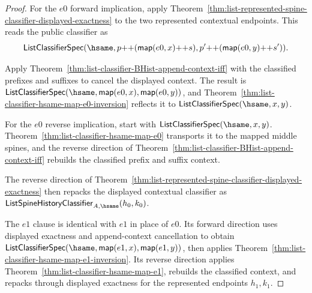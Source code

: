 \begin{proof}
For the $e0$ forward implication, apply
Theorem~\ref{thm:list-represented-spine-classifier-displayed-exactness} to the
two represented contextual endpoints. This reads the public classifier as
$$
\mathsf{ListClassifierSpec}(\hsame,
  p{++}(\mathsf{map}(e0,x){++}s),
  p'{++}(\mathsf{map}(e0,y){++}s')).
$$

Apply Theorem~\ref{thm:list-classifier-BHist-append-context-iff} with the
classified prefixes and suffixes to cancel the displayed context. The result is
$\mathsf{ListClassifierSpec}(\hsame,\mathsf{map}(e0,x),\mathsf{map}(e0,y))$,
and Theorem~\ref{thm:list-classifier-hsame-map-e0-inversion} reflects it to
$\mathsf{ListClassifierSpec}(\hsame,x,y)$.

For the $e0$ reverse implication, start with
$\mathsf{ListClassifierSpec}(\hsame,x,y)$. Theorem~\ref{thm:list-classifier-hsame-map-e0}
transports it to the mapped middle spines, and the reverse direction of
Theorem~\ref{thm:list-classifier-BHist-append-context-iff} rebuilds the
classified prefix and suffix context.

The reverse direction of
Theorem~\ref{thm:list-represented-spine-classifier-displayed-exactness} then
repacks the displayed contextual classifier as
$\mathsf{ListSpineHistoryClassifier}_{A,\hsame}(h_0,k_0)$.

The $e1$ clause is identical with $e1$ in place of $e0$. Its forward direction
uses displayed exactness and append-context cancellation to obtain
$\mathsf{ListClassifierSpec}(\hsame,\mathsf{map}(e1,x),\mathsf{map}(e1,y))$,
then applies Theorem~\ref{thm:list-classifier-hsame-map-e1-inversion}. Its
reverse direction applies Theorem~\ref{thm:list-classifier-hsame-map-e1},
rebuilds the classified context, and repacks through displayed exactness for
the represented endpoints $h_1,k_1$.
\end{proof}

